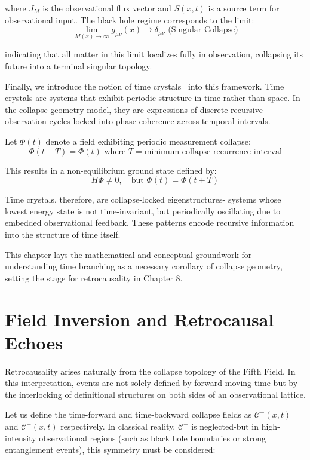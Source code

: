 where $J_M$ is the observational flux vector and $S(x,t)$ is a source term for observational input. The black hole regime corresponds to the limit:
\[ \lim_{M(x) \to \infty} g_{\mu\nu}(x) \to \delta_{\mu\nu} \text{ (Singular Collapse)} \]

indicating that all matter in this limit localizes fully in observation, collapsing its future into a terminal singular topology.

Finally, we introduce the notion of time crystals~\cite{wilczek2012quantum} into this framework. Time crystals are systems that exhibit periodic structure in time rather than space. In the collapse geometry model, they are expressions of discrete recursive observation cycles locked into phase coherence across temporal intervals.

Let $\Phi(t)$ denote a field exhibiting periodic measurement collapse:
\[ \Phi(t + T) = \Phi(t) \text{ where } T = \text{minimum collapse recurrence interval} \]

This results in a non-equilibrium ground state defined by:
\[ H \Phi \neq 0, \quad \text{but } \Phi(t) = \Phi(t+T) \]

Time crystals, therefore, are collapse-locked eigenstructures- systems whose lowest energy state is not time-invariant, but periodically oscillating due to embedded observational feedback. These patterns encode recursive information into the structure of time itself.

This chapter lays the mathematical and conceptual groundwork for understanding time branching as a necessary corollary of collapse geometry, setting the stage for retrocausality in Chapter 8.

\section*{Field Inversion and Retrocausal Echoes}\cite{chapter8_meta}

Retrocausality arises naturally from the collapse topology of the Fifth Field. In this interpretation, events are not solely defined by forward-moving time but by the interlocking of definitional structures on both sides of an observational lattice.

Let us define the time-forward and time-backward collapse fields as \( \mathcal{C}^+(x,t) \) and \( \mathcal{C}^-(x,t) \) respectively. In classical reality, \( \mathcal{C}^- \) is neglected-but in high-intensity observational regions (such as black hole boundaries or strong entanglement events), this symmetry must be considered:

